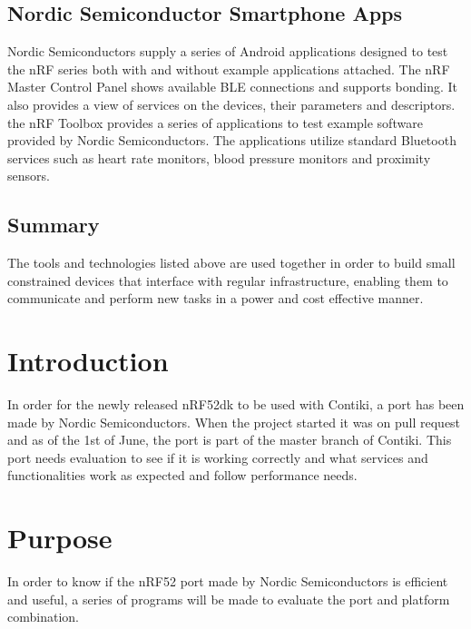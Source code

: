 \documentclass{article}
\begin{document}
\subsection{Nordic Semiconductor Smartphone Apps}
Nordic Semiconductors supply a series of Android applications designed to test the nRF series both with and without example applications attached.
The nRF Master Control Panel shows available BLE connections and supports bonding. It also provides a view of services on the devices, their parameters and descriptors.
the nRF Toolbox provides a series of applications to test example software provided by Nordic Semiconductors. The applications utilize standard Bluetooth services such as heart rate monitors, blood pressure monitors and proximity sensors.\\

\subsection{Summary}
The tools and technologies listed above are used together in order to build small constrained devices that interface with regular infrastructure, enabling them to communicate and perform new tasks in a power and cost effective manner.

\section{Introduction}
In order for the newly released nRF52dk to be used with Contiki, a port has been made by Nordic Semiconductors. When the project started it was on pull request and as of the 1st of June, the port is part of the master branch of Contiki. \cite{upstream}
This port needs evaluation to see if it is working correctly and what services and functionalities work as expected and follow performance needs.\\

\section{Purpose}
In order to know if the nRF52 port made by Nordic Semiconductors is efficient and useful, a series of programs will be made to evaluate the port and platform combination.\\
\end{document}

